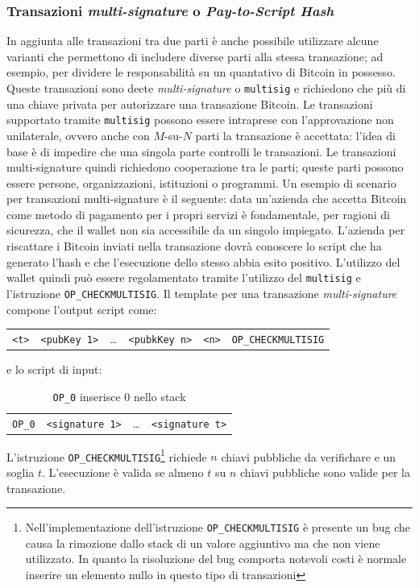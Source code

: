 \subsubsection{Transazioni \textit{multi-signature} o \textit{Pay-to-Script Hash}}
In aggiunta alle transazioni tra due parti è anche possibile utilizzare alcune varianti che permettono di includere diverse parti alla stessa transazione; ad esempio, per dividere le responsabilità su un quantativo di Bitcoin in possesso. Queste transazioni sono deete \textit{multi-signature} o \texttt{multisig} e richiedono che più di una chiave privata per autorizzare una transazione Bitcoin. Le transazioni supportato tramite \texttt{multisig} possono essere intraprese con l'approvazione non unilaterale, ovvero anche con $M$-su-$N$ parti la transazione è accettata: l'idea di base è di impedire che una singola parte controlli le transazioni. Le transazioni multi-signature quindi richiedono cooperazione tra le parti; queste parti possono essere persone, organizzazioni, istituzioni o programmi.\newline
Un esempio di scenario per transazioni multi-signature è il seguente: data un'azienda che accetta Bitcoin come metodo di pagamento per i propri servizi è fondamentale, per ragioni di sicurezza, che il wallet non sia accessibile da un singolo impiegato. L'azienda per riscattare i Bitcoin inviati nella transazione dovrà conoscere lo script che ha generato l'hash e che l'esecuzione dello stesso abbia esito positivo.
L'utilizzo del wallet quindi può essere regolamentato tramite l'utilizzo del \texttt{multisig} e l'istruzione \texttt{OP\_CHECKMULTISIG}.\newline
Il template per una transazione \textit{multi-signature} compone l'output script come:
\begin{table}[H]
    \centering
    \begin{tabular}{c|c|c|c|c|c}
        \texttt{<t>} & \texttt{<pubKey 1>} & \dots & \texttt{<pubkKey n>} & \texttt{<n>} & \texttt{OP\_CHECKMULTISIG}
    \end{tabular}
\end{table}
e lo script di input:
\begin{table}[H]
    \caption{\texttt{OP\_0} inserisce $0$ nello stack}
    \centering
    \begin{tabular}{c|c|c|c}
        \texttt{OP\_0} & \texttt{<signature 1>} & \dots & \texttt{<signature t>}
    \end{tabular}
\end{table}
L'istruzione \texttt{OP\_CHECKMULTISIG}\footnote{Nell'implementazione dell'istruzione \texttt{OP\_CHECKMULTISIG} è presente un bug che causa la rimozione dallo stack di un valore aggiuntivo ma che non viene utilizzato. In quanto la risoluzione del bug comporta notevoli costi è normale inserire un elemento nullo in questo tipo di transazioni} richiede $n$ chiavi pubbliche da verifichare e un soglia $t$. L'esecuzione è valida se almeno $t$ su $n$ chiavi pubbliche sono valide per la transazione.\newline
